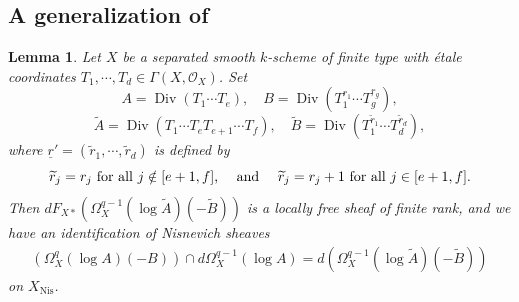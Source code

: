 \documentclass[11pt]{amsart}
\newcommand{\eq}[2]{\begin{equation}\label{#1}#2 \end{equation}}
\newcommand{\cO}{\mathcal{O}}
\newcommand{\Div}{\operatorname{Div}}
\newcommand{\Nis}{{\operatorname{Nis}}}
\newcommand{\ul}{\underline}
\renewcommand{\tilde}{\widetilde}
\theoremstyle{plain}
\newtheorem{lem}[prop]{Lemma}
\theoremstyle{definition}
\numberwithin{equation}{prop}
\begin{document}
\subsection{{A generalization of \cite[Lemma 8.10]{RamFil1}}}
\begin{lem}
\label{RR24lem8.10gen}
Let $X$ be a separated smooth $k$-scheme of finite type with \'etale coordinates $T_1,\cdots, T_d\in \Gamma(X,\cO_X)$.
Set 
$$A=\Div(T_1\cdots T_e), \quad
B=\Div(T_1^{r_1}\cdots   T_g^{r_g}),$$
$$\tilde A=\Div(T_1\cdots T_e T_{e+1}\cdots T_{f}),
\quad 
\tilde B=\Div(T_1^{\tilde r_1}\cdots  T_d^{\tilde r_d}),$$
where $\ul r'=(\tilde r_1, \cdots, \tilde r_d)$ is defined by
\eq{rprimedef}{
\tilde r_j=r_j \text{ for all $j\notin [e+1,f]$, 
\quad and \quad
$\tilde r_j=r_j+1$ for all $j\in [e+1,f]$.}
}
Then
$dF_{X*}\left(\Omega^{q-1}_{X}(\log \tilde A)(-\tilde B)\right)$ is a locally free sheaf of finite rank, and
we have an identification of Nisnevich sheaves 
\begin{align*} 
\left( \Omega^q_{X}(\log A)(-B)\right)\cap d\Omega^{q-1}_X(\log A)
=
d\left(\Omega^{q-1}_{X}(\log \tilde A)(-\tilde B)\right)
\end{align*}
on $X_\Nis$.
\end{lem}
\end{document}
